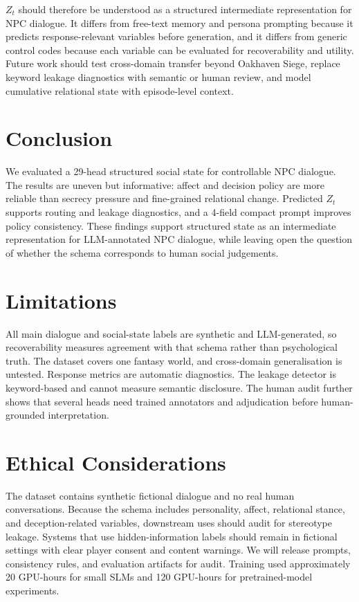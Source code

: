 \documentclass[11pt]{article}
\begin{document}
$Z_t$ should therefore be understood as a structured intermediate representation for NPC dialogue. It differs from free-text memory and persona prompting because it predicts response-relevant variables before generation, and it differs from generic control codes because each variable can be evaluated for recoverability and utility. Future work should test cross-domain transfer beyond Oakhaven Siege, replace keyword leakage diagnostics with semantic or human review, and model cumulative relational state with episode-level context.

\section{Conclusion}
\label{sec:conclusion}

We evaluated a 29-head structured social state for controllable NPC dialogue. The results are uneven but informative: affect and decision policy are more reliable than secrecy pressure and fine-grained relational change. Predicted $Z_t$ supports routing and leakage diagnostics, and a 4-field compact prompt improves policy consistency. These findings support structured state as an intermediate representation for LLM-annotated NPC dialogue, while leaving open the question of whether the schema corresponds to human social judgements.

\section*{Limitations}
\label{sec:limitations}

All main dialogue and social-state labels are synthetic and LLM-generated, so recoverability measures agreement with that schema rather than psychological truth. The dataset covers one fantasy world, and cross-domain generalisation is untested. Response metrics are automatic diagnostics. The leakage detector is keyword-based and cannot measure semantic disclosure. The human audit further shows that several heads need trained annotators and adjudication before human-grounded interpretation.

\section*{Ethical Considerations}

The dataset contains synthetic fictional dialogue and no real human conversations. Because the schema includes personality, affect, relational stance, and deception-related variables, downstream uses should audit for stereotype leakage. Systems that use hidden-information labels should remain in fictional settings with clear player consent and content warnings. We will release prompts, consistency rules, and evaluation artifacts for audit. Training used approximately 20 GPU-hours for small SLMs and 120 GPU-hours for pretrained-model experiments.
\end{document}
